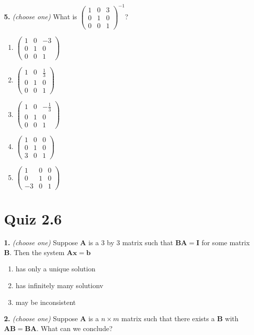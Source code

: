 \documentclass[10pt,a4paper]{article}
\begin{document}
\smallskip
\textbf{5.} \textit{(choose one)} What is \(\begin{pmatrix}1&0&3\\0&1&0\\0&0&1\end{pmatrix}^{-1}\)?

\begin{enumerate}[label=(\Alph*)]
\item \(\begin{pmatrix}1&0&-3\\0&1&0\\0&0&1\end{pmatrix}\)
\item \(\begin{pmatrix}1&0&\frac{1}{3}\\0&1&0\\0&0&1\end{pmatrix}\)
\item \(\begin{pmatrix}1&0&-\frac{1}{3}\\0&1&0\\0&0&1\end{pmatrix}\)
\item \(\begin{pmatrix}1&0&0\\0&1&0\\3&0&1\end{pmatrix}\)
\item \(\begin{pmatrix}1&0&0\\0&1&0\\-3&0&1\end{pmatrix}\)
\end{enumerate}
\smallskip
\section{Quiz 2.6}
\textbf{1.} \textit{(choose one)} Suppose \(\mathbf{A}\) is a 3 by 3 matrix such that \(\mathbf{BA=I}\) for some matrix \(\mathbf{B}\). Then the system \(\mathbf{Ax=b}\)

\begin{enumerate}[label=(\Alph*)]
\item has only a unique solution
\item has infinitely many solutionv
\item may be inconsistent
\end{enumerate}
\smallskip
\textbf{2.} \textit{(choose one)} Suppose \(\mathbf{A}\) is a \(n\times m\) matrix such that there exists a \(\mathbf{B}\) with \(\mathbf{AB=BA}\). What can we conclude?
\end{document}
